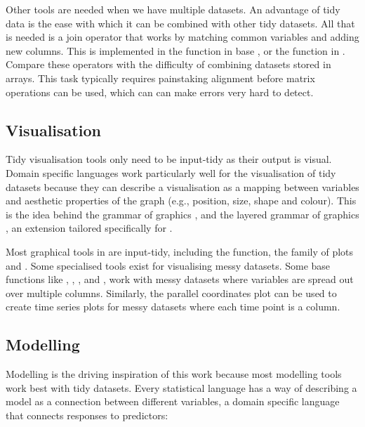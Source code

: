 \documentclass[article]{jss}
\begin{document}
Other tools are needed when we have multiple datasets. An advantage of tidy data is the ease with which it can be combined with other tidy datasets. All that is needed is a join operator that works by matching common variables and adding new columns. This is implemented in the  function in base , or the  function in . Compare these operators with the difficulty of combining datasets stored in arrays. This task typically requires painstaking alignment before matrix operations can be used, which can can make errors very hard to detect.

\subsection{Visualisation}

Tidy visualisation tools only need to be input-tidy as their output is visual. Domain specific languages work particularly well for the visualisation of tidy datasets because they can describe a visualisation as a mapping between variables and aesthetic properties of the graph (e.g., position, size, shape and colour). This is the idea behind the grammar of graphics \citep{wilkinson:2006}, and the layered grammar of graphics \citep{wickham:2007d}, an extension tailored specifically for .

Most graphical tools in  are input-tidy, including the   function, the  family of plots \citep{sarkar:2008} and  \citep{me:ggplot2}. Some specialised tools exist for visualising messy datasets. Some base  functions like , , , and , work with messy datasets where variables are spread out over multiple columns. Similarly, the parallel coordinates plot \citep{wegman:1990,inselberg:1985} can be used to create time series plots for messy datasets where each time point is a column.

\subsection{Modelling}
\label{sub:modelling}

Modelling is the driving inspiration of this work because most modelling tools work best with tidy datasets. Every statistical language has a way of describing a model as a connection between different variables, a domain specific language that connects responses to predictors: 
\end{document}
